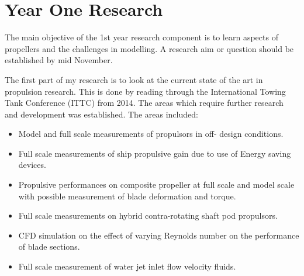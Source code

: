 \documentclass[12pt]{article}
\begin{document}
\section{Year One Research}

The main objective of the 1st year research component is to learn aspects of propellers and the challenges in modelling. A research aim or question should be established by mid November. 

The first part of my research is to look at the current state of the art in propulsion research. This is done by reading through the International Towing Tank Conference (ITTC) from 2014. The areas which require further research and development was established. The areas included:

\begin{itemize}

\item Model and full scale measurements of propulsors in off- design conditions.

\item Full scale measurements of ship propulsive gain due to use of Energy saving devices.

\item Propulsive performances on composite propeller at full scale and model scale with possible measurement of blade deformation and torque.

\item Full scale measurements on hybrid contra-rotating shaft pod propulsors.

\item CFD simulation on the effect of varying Reynolds number on the performance of blade sections.

\item Full scale measurement of water jet inlet flow velocity fluids.
\end{itemize}
\end{document}
